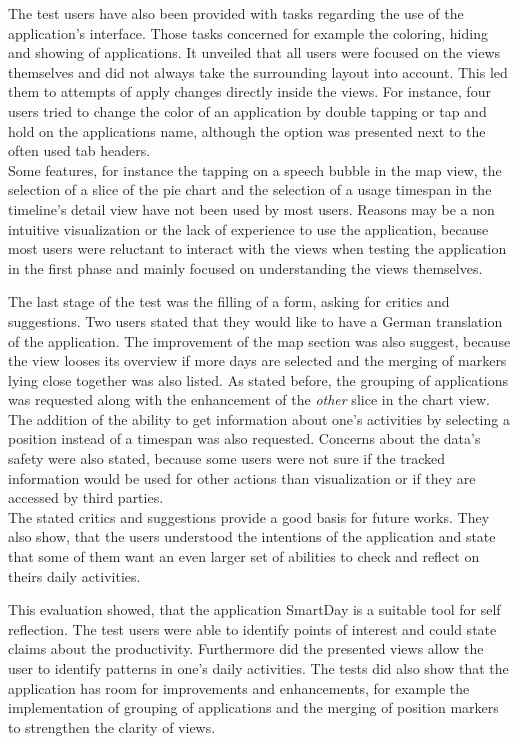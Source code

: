 The  test users have also been provided with tasks regarding the use of the application's interface. Those tasks concerned for example the coloring, hiding and showing of applications. It unveiled that all users were focused on the views themselves and did not always take the surrounding layout into account. This led them to attempts of apply changes directly inside the views. For instance, four users tried to change the color of an application by double tapping or tap and hold on the applications name, although the option was presented next to the often used tab headers.\\
Some features, for instance the tapping on a speech bubble in the map view, the selection of a slice of the pie chart and the selection of a usage timespan in the timeline's detail view have not been used by most users. Reasons may be a non intuitive visualization or the lack of experience to use the application, because most users were reluctant to interact with the views when testing the application in the first phase and mainly focused on understanding the views themselves.

The  last stage of the test was the filling of a form, asking for critics and suggestions. Two users stated that they would like to have a German translation of the application. The improvement of the map section was also suggest, because the view looses its overview if more days are selected and the merging of markers lying close together was also listed. As stated before, the grouping of applications was requested along with the enhancement of the \emph{other} slice in the chart view. The addition of the ability to get information about one's activities by selecting a position instead of a timespan was also requested. Concerns about the data's safety were also stated, because some users were not sure if the tracked information would be used for other actions than visualization or if they are accessed by third parties.\\
The stated critics and suggestions provide a good basis for future works. They also show, that the users understood the intentions of the application and state that some of them want an even larger set of abilities to check and reflect on theirs daily activities.

This evaluation showed, that the application SmartDay is a suitable tool for self reflection. The test users were able to identify points of interest and could state claims about the productivity. Furthermore did the presented views allow the user to identify patterns in one's daily activities. The tests did also show that the application has room for improvements and enhancements, for example the implementation of grouping of applications and the merging of position markers to strengthen the clarity of views.